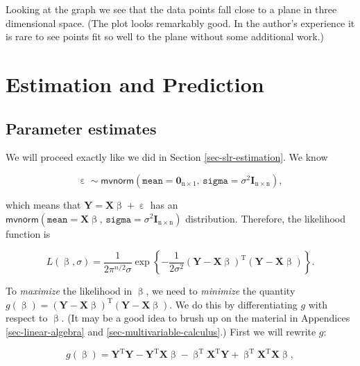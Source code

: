\documentclass[]{book}
\numberwithin{equation}{chapter}
\numberwithin{figure}{chapter}
\theoremstyle{plain}
\theoremstyle{definition}
\theoremstyle{remark}
\theoremstyle{definition}
\theoremstyle{definition}
\theoremstyle{remark}
\begin{document}
Looking at the graph we see that the data points fall close to a plane
in three dimensional space. (The plot looks remarkably good. In the
author's experience it is rare to see points fit so well to the plane
without some additional work.)

\section{Estimation and
Prediction}\label{sec-estimation-and-prediction-mlr}

\subsection{Parameter estimates}\label{sub-mlr-parameter-estimates}

We will proceed exactly like we did in Section \ref{sec-slr-estimation}.
We know

\begin{equation}
\upepsilon\sim\mathsf{mvnorm}\left(\mathtt{mean}=\mathbf{0}_{\mathrm{n}\times1},\,\mathtt{sigma}=\sigma^{2}\mathbf{I}_{\mathrm{n}\times\mathrm{n}}\right),
\end{equation}

which means that \(\mathbf{Y}=\mathbf{X}\upbeta+\upepsilon\) has an
\(\mathsf{mvnorm}\left(\mathtt{mean}=\mathbf{X}\upbeta,\,\mathtt{sigma}=\sigma^{2}\mathbf{I}_{\mathrm{n}\times\mathrm{n}}\right)\)
distribution. Therefore, the likelihood function
 is

\begin{equation}
L(\upbeta,\sigma)=\frac{1}{2\pi^{n/2}\sigma}\exp\left\{ -\frac{1}{2\sigma^{2}}\left(\mathbf{Y}-\mathbf{X}\upbeta\right)^{\mathrm{T}}\left(\mathbf{Y}-\mathbf{X}\upbeta\right)\right\}.
\end{equation}

To \emph{maximize} the likelihood  in
\(\upbeta\), we need to \emph{minimize} the quantity
\(g(\upbeta)=\left(\mathbf{Y}-\mathbf{X}\upbeta\right)^{\mathrm{T}}\left(\mathbf{Y}-\mathbf{X}\upbeta\right)\).
We do this by differentiating \(g\) with respect to \(\upbeta\). (It may
be a good idea to brush up on the material in Appendices
\ref{sec-linear-algebra} and \ref{sec-multivariable-calculus}.) First we
will rewrite \(g\):

\begin{equation}
g(\upbeta)=\mathbf{Y}^{\mathrm{T}}\mathbf{Y}-\mathbf{Y}^{\mathrm{T}}\mathbf{X}\upbeta-\upbeta^{\mathrm{T}}\mathbf{X}^{\mathrm{T}}\mathbf{Y}+\upbeta^{\mathrm{T}}\mathbf{X}^{\mathrm{T}}\mathbf{X}\upbeta,
\end{equation}
\end{document}
